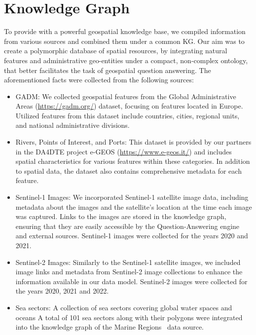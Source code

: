 \section{Knowledge Graph}
\label{sec:kg}

To provide \EngineName{} with a powerful geospatial knowledge base, we compiled information from various sources and combined them under a common KG. Our aim was to create a polymorphic database of spatial resources, by integrating natural features and administrative geo-entities under a compact, non-complex ontology, that better facilitates the task of geospatial question answering.  The aforementioned facts were collected from the following sources:
\begin{itemize}
    \item GADM: We collected geospatial features from the Global Administrative Areas (\url{https://gadm.org/}) dataset, focusing on features located in Europe. Utilized features from this dataset include countries, cities, regional units, and national administrative divisions.
    \item Rivers, Points of Interest, and Ports: This dataset is provided by our partners in the DA4DTE project e-GEOS (\url{https://www.e-geos.it/}) and includes spatial characteristics for various features within these categories. In addition to spatial data, the dataset also contains comprehensive metadata for each feature.
    \item Sentinel-1 Images: We incorporated Sentinel-1 satellite image data, including metadata about the images and the satellite's location at the time each image was captured. Links to the images are stored in the knowledge graph, ensuring that they are easily accessible by the Question-Answering engine and external sources. Sentinel-1 images were collected for the years 2020 and 2021.
    \item Sentinel-2 Images: Similarly to the Sentinel-1 satellite images, we included image links and metadata from Sentinel-2 image collections to enhance the information available in our data model. Sentinel-2 images were collected for the years 2020, 2021 and 2022.
    \item Sea sectors: A collection of sea sectors covering global water spaces and oceans A total of 101 sea sectors along with their polygons were integrated into the knowledge graph of the Marine Regions~\cite{marine-regions} data source.
\end{itemize}

